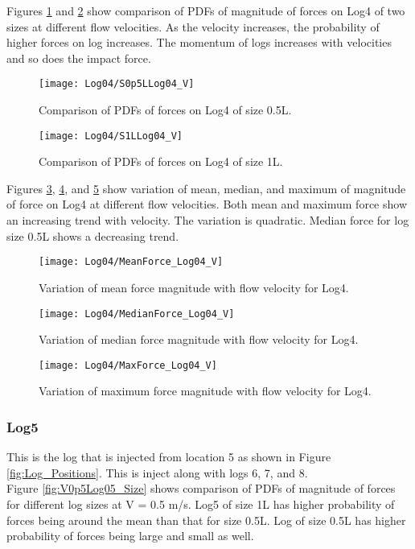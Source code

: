 \noindent Figures \ref{fig:S0p5LLog04_V} and \ref{fig:S1LLog04_V} show comparison of PDFs of magnitude of forces on Log4 of two sizes at different flow velocities. As the velocity increases, the probability of higher forces on log increases. The momentum of logs increases with velocities and so does the impact force.

\begin{figure}
\centering
\texttt{[image: Log04/S0p5LLog04\_V]}
\caption{\label{fig:S0p5LLog04_V}Comparison of PDFs of forces on Log4 of size 0.5L.}
\end{figure}
\begin{figure}
\centering
\texttt{[image: Log04/S1LLog04\_V]}
\caption{\label{fig:S1LLog04_V}Comparison of PDFs of forces on Log4 of size 1L.}
\end{figure}

\noindent Figures \ref{fig:MeanForce_Log04_V}, \ref{fig:MedianForce_Log04_V}, and \ref{fig:MaxForce_Log04_V} show variation of mean, median, and maximum of magnitude of force on Log4 at different flow velocities. Both mean and maximum force show an increasing trend with velocity. The variation is quadratic. Median force for log size 0.5L shows a decreasing trend.

\begin{figure}
\centering
\texttt{[image: Log04/MeanForce\_Log04\_V]}
\caption{\label{fig:MeanForce_Log04_V}Variation of mean force magnitude with flow velocity for Log4.}
\end{figure}
\begin{figure}
\centering
\texttt{[image: Log04/MedianForce\_Log04\_V]}
\caption{\label{fig:MedianForce_Log04_V}Variation of median force magnitude with flow velocity for Log4.}
\end{figure}
\begin{figure}
\centering
\texttt{[image: Log04/MaxForce\_Log04\_V]}
\caption{\label{fig:MaxForce_Log04_V}Variation of maximum force magnitude with flow velocity for Log4.}
\end{figure}

\FloatBarrier
\subsubsection{Log5}
This is the log that is injected from location 5 as shown in Figure \ref{fig:Log_Positions}. This is inject along with logs 6, 7, and 8.\\ 
Figure \ref{fig:V0p5Log05_Size} shows comparison of PDFs of magnitude of forces for different log sizes at V = 0.5 m/s. Log5 of size 1L has higher probability of forces being around the mean than that for size 0.5L. Log of size 0.5L has higher probability of forces being large and small as well.

